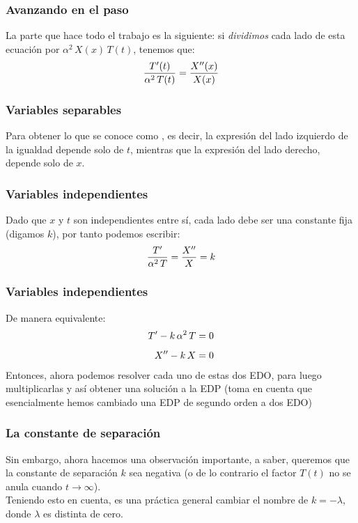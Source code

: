 \documentclass[12pt]{beamer}
\begin{document}
\begin{frame}
\frametitle{Avanzando en el paso}
La parte que hace todo el trabajo es la siguiente: si \emph{dividimos} cada lado de esta ecuación por $\alpha^{2} \, X (x) \, T (t)$, tenemos que:
\pause
\begin{align*}
\dfrac{{T}^{\prime} (t)}{\alpha^{2} \, T (t)} = \dfrac{{X}^{\prime \prime} (x)}{X (x)}
\end{align*}
\end{frame}
\begin{frame}
\frametitle{Variables separables}
Para obtener lo que se conoce como , es decir, la expresión del lado izquierdo de la igualdad depende solo de $t$, mientras que la expresión del lado derecho, depende solo de $x$. %
\end{frame}
\begin{frame}
\frametitle{Variables independientes}
Dado que $x$ y $t$ son independientes entre sí, cada lado debe ser una constante fija (digamos $k$),  por tanto podemos escribir:
\pause
\begin{align*}
\dfrac{{T}^{\prime}}{\alpha^{2} \, T} = \dfrac{{X}^{\prime \prime}}{X} = k
\end{align*}
\end{frame}
\begin{frame}
\frametitle{Variables independientes}
De manera equivalente:
\pause
\begin{align*}
{T}^{\prime} - k \, \alpha^{2} \, T &= 0 \\[0.5em]
{X}^{\prime \prime} - k \, X &= 0
\end{align*}
\pause
Entonces, ahora podemos resolver cada uno de estas dos EDO, para luego multiplicarlas y así obtener una solución a la EDP (toma en cuenta que esencialmente hemos cambiado una EDP de segundo orden a dos EDO)
\end{frame}
\begin{frame}
\frametitle{La constante de separación}
Sin embargo, ahora hacemos una observación importante, a saber, queremos que la constante de separación $k$ sea negativa (o de lo contrario el factor $T (t)$ no se anula cuando $t \to \infty$).
\\
\bigskip
\pause
Teniendo esto en cuenta, es una práctica general cambiar el nombre de $k = - \lambda$, donde $\lambda$ es distinta de cero. 
\end{frame}
\end{document}
